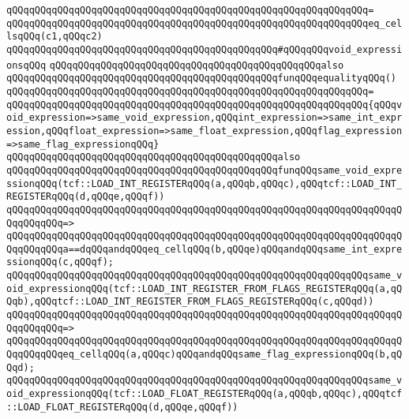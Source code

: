 \verb|qQQqqQQqqQQqqQQqqQQqqQQqqQQqqQQqqQQqqQQqqQQqqQQqqQQqqQQqqQQqqQQq=|\newline
\verb|qQQqqQQqqQQqqQQqqQQqqQQqqQQqqQQqqQQqqQQqqQQqqQQqqQQqqQQqqQQqqQQqeq_cellsqQQq(c1,qQQqc2)|\newline
\newline
\verb|qQQqqQQqqQQqqQQqqQQqqQQqqQQqqQQqqQQqqQQqqQQqqQQq#qQQqqQQqvoid_expressionsqQQq|\newline
\verb|qQQqqQQqqQQqqQQqqQQqqQQqqQQqqQQqqQQqqQQqqQQqqQQqalso|\newline
\verb|qQQqqQQqqQQqqQQqqQQqqQQqqQQqqQQqqQQqqQQqqQQqqQQqfunqQQqequalityqQQq()|\newline
\verb|qQQqqQQqqQQqqQQqqQQqqQQqqQQqqQQqqQQqqQQqqQQqqQQqqQQqqQQqqQQqqQQq=|\newline
\verb|qQQqqQQqqQQqqQQqqQQqqQQqqQQqqQQqqQQqqQQqqQQqqQQqqQQqqQQqqQQqqQQq{qQQqvoid_expression=>same_void_expression,qQQqint_expression=>same_int_expression,qQQqfloat_expression=>same_float_expression,qQQqflag_expression=>same_flag_expressionqQQq}|\newline
\newline
\verb|qQQqqQQqqQQqqQQqqQQqqQQqqQQqqQQqqQQqqQQqqQQqqQQqalso|\newline
\verb|qQQqqQQqqQQqqQQqqQQqqQQqqQQqqQQqqQQqqQQqqQQqqQQqfunqQQqsame_void_expressionqQQq(tcf::LOAD_INT_REGISTERqQQq(a,qQQqb,qQQqc),qQQqtcf::LOAD_INT_REGISTERqQQq(d,qQQqe,qQQqf))|\newline
\verb|qQQqqQQqqQQqqQQqqQQqqQQqqQQqqQQqqQQqqQQqqQQqqQQqqQQqqQQqqQQqqQQqqQQqqQQqqQQqqQQq=>|\newline
\verb|qQQqqQQqqQQqqQQqqQQqqQQqqQQqqQQqqQQqqQQqqQQqqQQqqQQqqQQqqQQqqQQqqQQqqQQqqQQqqQQqa==dqQQqandqQQqeq_cellqQQq(b,qQQqe)qQQqandqQQqsame_int_expressionqQQq(c,qQQqf);|\newline
\newline
\verb|qQQqqQQqqQQqqQQqqQQqqQQqqQQqqQQqqQQqqQQqqQQqqQQqqQQqqQQqqQQqqQQqsame_void_expressionqQQq(tcf::LOAD_INT_REGISTER_FROM_FLAGS_REGISTERqQQq(a,qQQqb),qQQqtcf::LOAD_INT_REGISTER_FROM_FLAGS_REGISTERqQQq(c,qQQqd))|\newline
\verb|qQQqqQQqqQQqqQQqqQQqqQQqqQQqqQQqqQQqqQQqqQQqqQQqqQQqqQQqqQQqqQQqqQQqqQQqqQQqqQQq=>|\newline
\verb|qQQqqQQqqQQqqQQqqQQqqQQqqQQqqQQqqQQqqQQqqQQqqQQqqQQqqQQqqQQqqQQqqQQqqQQqqQQqqQQqeq_cellqQQq(a,qQQqc)qQQqandqQQqsame_flag_expressionqQQq(b,qQQqd);|\newline
\newline
\verb|qQQqqQQqqQQqqQQqqQQqqQQqqQQqqQQqqQQqqQQqqQQqqQQqqQQqqQQqqQQqqQQqsame_void_expressionqQQq(tcf::LOAD_FLOAT_REGISTERqQQq(a,qQQqb,qQQqc),qQQqtcf::LOAD_FLOAT_REGISTERqQQq(d,qQQqe,qQQqf))|\newline
